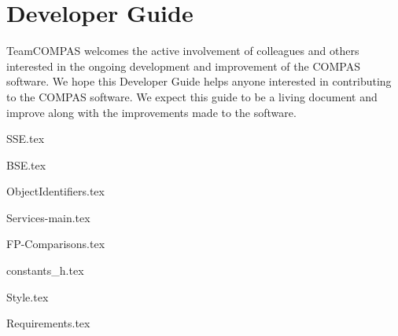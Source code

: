 \newpage\section{Developer Guide}\label{sec:DeveloperGuide}

TeamCOMPAS welcomes the active involvement of colleagues and others interested in the ongoing development and improvement of the COMPAS software.  We hope this Developer Guide helps anyone interested in contributing to the COMPAS software.  We expect this guide to be a living document and improve along with the improvements made to the software.


\clearpage
{SSE.tex}


\clearpage
{BSE.tex}


\clearpage
{ObjectIdentifiers.tex}


\clearpage
{Services-main.tex}


\clearpage
{FP-Comparisons.tex}


\clearpage
{constants_h.tex}


\clearpage
{Style.tex}


\clearpage
{Requirements.tex}
